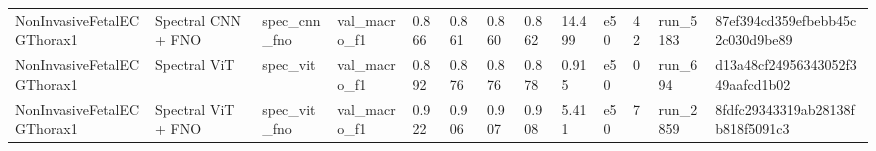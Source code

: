 \begin{table}
\begin{tabular}{lllllllllllll}
NonInvasiveFetalECGThorax1 & Spectral CNN + FNO & spec\_cnn\_fno & val\_macro\_f1 & 0.866 & 0.861 & 0.860 & 0.862 & 14.499 & e50 & 42 & run\_5183 & 87ef394cd359efbebb45c2c030d9be89 \\
NonInvasiveFetalECGThorax1 & Spectral ViT & spec\_vit & val\_macro\_f1 & 0.892 & 0.876 & 0.876 & 0.878 & 0.915 & e50 & 0 & run\_694 & d13a48cf24956343052f349aafcd1b02 \\
NonInvasiveFetalECGThorax1 & Spectral ViT + FNO & spec\_vit\_fno & val\_macro\_f1 & 0.922 & 0.906 & 0.907 & 0.908 & 5.411 & e50 & 7 & run\_2859 & 8fdfc29343319ab28138fb818f5091c3 \\
\bottomrule
\end{tabular}
\end{table}
